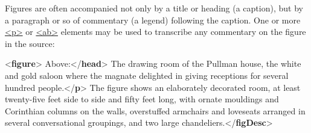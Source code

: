 Figures are often accompanied not only by a title or heading (a caption), but by a paragraph or so of commentary (a legend) following the caption. One or more \hyperref[TEI.p]{<p>} or \hyperref[TEI.ab]{<ab>} elements  may be used to transcribe any commentary on the figure in the source: \par\bgroup{}\exampleFont \begin{shaded}\noindent\mbox{}{<\textbf{figure}>}\mbox{}\newline 
{}\mbox{}\newline 
{}Above:{</\textbf{head}>}\mbox{}\newline 
{}The drawing room of the Pullman house, the white and gold saloon\mbox{}\newline 
\hspace*{1em}\hspace*{1em} where the magnate delighted in giving receptions for several hundred\mbox{}\newline 
\hspace*{1em}\hspace*{1em} people.{</\textbf{p}>}\mbox{}\newline 
{}The figure shows an elaborately decorated room, at least\mbox{}\newline 
\hspace*{1em}\hspace*{1em} twenty-five feet side to side and fifty feet long, with ornate\mbox{}\newline 
\hspace*{1em}\hspace*{1em} mouldings and Corinthian columns on the walls, overstuffed armchairs\mbox{}\newline 
\hspace*{1em}\hspace*{1em} and loveseats arranged in several conversational groupings, and two\mbox{}\newline 
\hspace*{1em}\hspace*{1em} large chandeliers.{</\textbf{figDesc}>}\mbox{}\newline 

\end{shaded}
